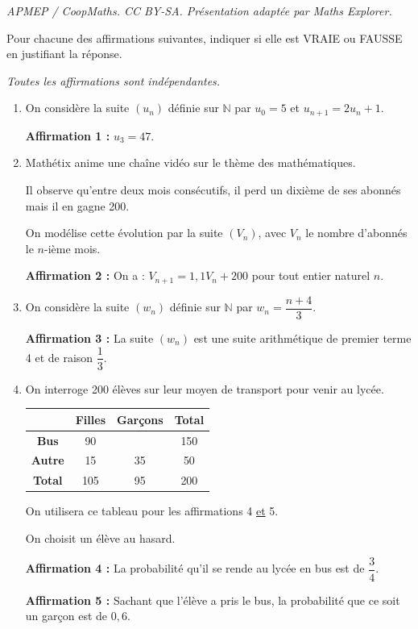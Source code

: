\documentclass[10pt]{article}
\begin{document}
\noindent\textit{APMEP / CoopMaths. CC BY-SA. Présentation adaptée par Maths Explorer.}\par\medskip
Pour chacune des affirmations suivantes, indiquer si elle est VRAIE ou FAUSSE en justifiant la réponse.

\textit{Toutes les affirmations sont indépendantes.}

\begin{enumerate}
\item On considère la suite $(u_n)$ définie sur $\mathbb{N}$ par $u_0=5$ et $u_{n+1}=2u_n+1$.

\textbf{Affirmation 1 :} $u_3=47$.

\bigskip

\item Mathétix anime une chaîne vidéo sur le thème des mathématiques.

Il observe qu'entre deux mois consécutifs, il perd un dixième de ses abonnés mais il en gagne 200.

On modélise cette évolution par la suite $(V_n)$, avec $V_n$ le nombre d'abonnés le $n$-ième mois.

\textbf{Affirmation 2 :} On a : $V_{n+1}=1{,}1V_n+200$ pour tout entier naturel $n$.

\bigskip

\item On considère la suite $(w_n)$ définie sur $\mathbb{N}$ par $w_n=\dfrac{n+4}{3}$.

\textbf{Affirmation 3 :} La suite $(w_n)$ est une suite arithmétique de premier terme 4 et de raison $\dfrac{1}{3}$.

\bigskip

\item On interroge 200 élèves sur leur moyen de transport pour venir au lycée.
\begin{center}
\begin{tabular}{|c|c|c|c|}
\hline
 & \textbf{Filles} & \textbf{Garçons} & \textbf{Total}\\
\hline
\textbf{Bus} & 90 &  & 150\\
\hline
\textbf{Autre} & 15 & 35 & 50\\
\hline
\textbf{Total} & 105 & 95 & 200\\
\hline
\end{tabular}
\end{center}
On utilisera ce tableau pour les affirmations 4 \underline{et} 5.

On choisit un élève au hasard.

\bigskip

\textbf{Affirmation 4 :} La probabilité qu'il se rende au lycée en bus est de $\dfrac{3}{4}$.

\bigskip

\textbf{Affirmation 5 :} Sachant que l'élève a pris le bus, la probabilité que ce soit un garçon est de $0{,}6$.
\end{enumerate}
\end{document}
